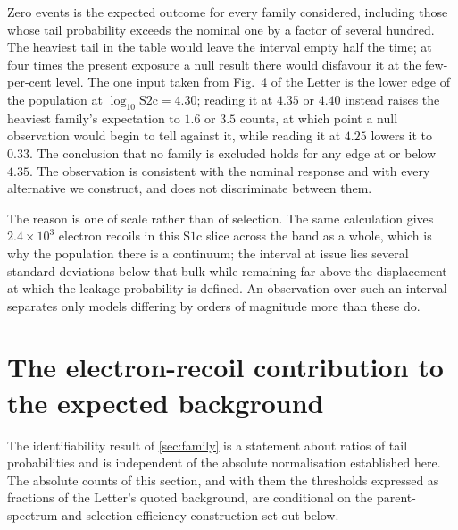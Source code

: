 \documentclass[11pt,a4paper]{article}
\begin{document}
\noindent Zero events is the expected outcome for every family
considered, including those whose tail probability exceeds the nominal
one by a factor of several hundred. The heaviest tail in the table would
leave the interval empty half the time; at four times the present
exposure a null result there would disfavour it at the few-per-cent
level. The one input
taken from Fig.~4 of the Letter is the lower edge of the population at
\(\log_{10}\mathrm{S2c}=4.30\); reading it at \(4.35\) or \(4.40\)
instead raises the heaviest family's expectation to \(1.6\) or \(3.5\)
counts, at which point a null observation would begin to tell against
it, while reading it at \(4.25\) lowers it to \(0.33\). The conclusion that
no family is excluded holds for any edge at or below \(4.35\). The
observation is consistent with the nominal response and with every
alternative we construct, and does not discriminate between them.

The reason is one of scale rather than of selection. The same
calculation gives \(2.4\times10^{3}\) electron recoils in this
\(\mathrm{S1c}\) slice across the band as a whole, which is why the
population there is a continuum; the interval at issue lies several
standard deviations below that bulk while remaining far above the
displacement at which the leakage probability is defined. An observation
over such an interval separates only models differing by orders of
magnitude more than these do.


\section{The electron-recoil contribution to the expected background}%
\label{sec:leak}

The identifiability result of \cref{sec:family} is a statement about
ratios of tail probabilities and is independent of the absolute
normalisation established here. The absolute counts of this section, and
with them the thresholds expressed as fractions of the Letter's quoted
background, are conditional on the parent-spectrum and
selection-efficiency construction set out below.
\end{document}
